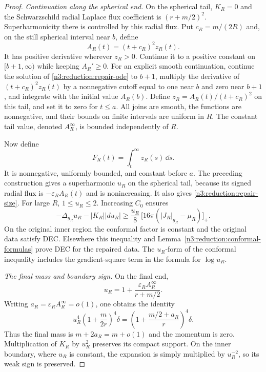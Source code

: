\begin{proof}
\emph{Continuation along the spherical end.} On the spherical tail,
$K_R=0$ and the Schwarzschild radial Laplace flux coefficient is
$(r+m/2)^2$. Superharmonicity there is controlled by this radial flux.
Put $c_R=m/(2R)$ and, on the still spherical
interval near $b$, define
\[
 A_R(t)=(t+c_R)^2z_R(t).
\]
It has positive derivative wherever $z_R>0$.  Continue it to a positive
constant on $[b+1,\infty)$ while keeping $A_R'\ge0$.  For an explicit
smooth continuation, continue the solution of
\eqref{n3:reduction:repair-ode} to $b+1$, multiply the derivative
of $(t+c_R)^2z_R(t)$ by a nonnegative cutoff equal to one near $b$ and
zero near $b+1$, and integrate with the initial value $A_R(b)$.
Define $z_R=A_R(t)/(t+c_R)^2$ on this tail, and set it to zero for
$t\le a$.  All joins are smooth, the functions are nonnegative, and
their bounds on finite intervals are uniform in $R$.  The constant
tail value, denoted $A_R^\infty$, is bounded independently of $R$.

Now define
\[
 F_R(t)=\int_t^\infty z_R(s)\,\dd s.
\]
It is nonnegative, uniformly bounded, and constant before $a$.
The preceding construction gives a superharmonic $u_R$ on the spherical
tail, because its signed radial flux is
$-\varepsilon_RA_R(t)$ and is nonincreasing.  It also gives
\eqref{n3:reduction:repair-size}.  For large $R$, $1\le u_R\le2$.
Increasing $C_0$ ensures
\[
 -\Delta_{g_R}u_R-|K_R||du_R|
 \ge \frac{u_R}{8}\,
       \bigl[16\pi(|J_R|_{g_R}-\mu_R)\bigr]_+.
\]
On the original inner region the conformal factor is constant and the
original data satisfy DEC.  Elsewhere this inequality and
Lemma~\ref{n3:reduction:conformal-formulas} prove DEC for the repaired data.
The $u_R$-form of the conformal inequality includes the gradient-square
term in the formula for $\log u_R$.

\emph{The final mass and boundary sign.} On the final end,
\[
 u_R=1+\frac{\varepsilon_RA_R^\infty}{r+m/2}.
\]
Writing $a_R=\varepsilon_RA_R^\infty=o(1)$, one obtains the identity
\begin{equation}
 \label{n3:reduction:repaired-schwarzschild}
 u_R^4\left(1+\frac{m}{2r}\right)^4\delta
   =\left(1+\frac{m/2+a_R}{r}\right)^4\delta.
\end{equation}
Thus the final mass is $m+2a_R=m+o(1)$ and the momentum is zero.
Multiplication of $K_R$ by $u_R^2$ preserves its compact support.
On the inner boundary, where $u_R$ is constant, the expansion is simply
multiplied by $u_R^{-2}$, so its weak sign is preserved.
\end{proof}

